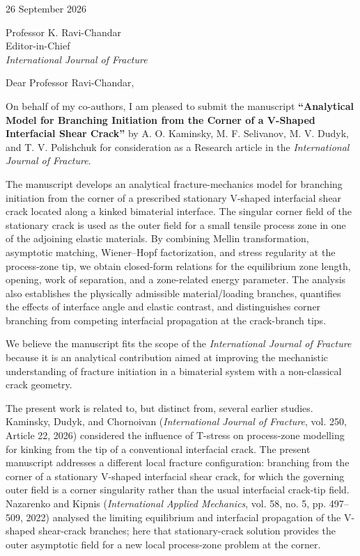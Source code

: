 \documentclass[11pt,a4paper]{article}
\begin{document}
\begin{flushright}
26 September 2026
\end{flushright}

Professor K. Ravi-Chandar\\
Editor-in-Chief\\
\textit{International Journal of Fracture}

Dear Professor Ravi-Chandar,

On behalf of my co-authors, I am pleased to submit the manuscript
\textbf{\textquotedblleft Analytical Model for Branching Initiation from the Corner of a
V-Shaped Interfacial Shear Crack\textquotedblright} by A. O. Kaminsky, M. F. Selivanov,
M. V. Dudyk, and T. V. Polishchuk for consideration as a Research article
in the \textit{International Journal of Fracture}.

The manuscript develops an analytical fracture-mechanics model for branching
initiation from the corner of a prescribed stationary V-shaped interfacial
shear crack located along a kinked bimaterial interface. The singular corner
field of the stationary crack is used as the outer field for a small tensile
process zone in one of the adjoining elastic materials. By combining Mellin
transformation, asymptotic matching, Wiener--Hopf factorization, and stress
regularity at the process-zone tip, we obtain closed-form relations for the
equilibrium zone length, opening, work of separation, and a zone-related
energy parameter. The analysis also establishes the physically admissible
material/loading branches, quantifies the effects of interface angle and
elastic contrast, and distinguishes corner branching from competing
interfacial propagation at the crack-branch tips.

We believe the manuscript fits the scope of the \textit{International Journal
of Fracture} because it is an analytical contribution aimed at improving the
mechanistic understanding of fracture initiation in a bimaterial system with
a non-classical crack geometry.

The present work is related to, but distinct from, several earlier studies.
Kaminsky, Dudyk, and Chornoivan (\textit{International Journal of Fracture}, vol. 250, Article 22, 2026) considered the influence of T-stress on process-zone modelling
for kinking from the tip of a conventional interfacial crack. The present
manuscript addresses a different local fracture configuration: branching from
the corner of a stationary V-shaped interfacial shear crack, for which the
governing outer field is a corner singularity rather than the usual
interfacial crack-tip field. Nazarenko and Kipnis
(\textit{International Applied Mechanics}, vol. 58, no. 5, pp. 497--509, 2022) analysed the limiting
equilibrium and interfacial propagation of the V-shaped shear-crack branches;
here that stationary-crack solution provides the outer asymptotic field for a
new local process-zone problem at the corner.
\end{document}
